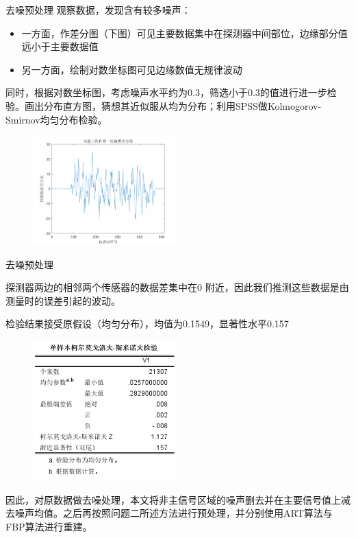 \documentclass{beamer}
\begin{document}
\begin{frame}{去噪预处理}
	\small 观察数据，发现含有较多噪声：
	  
	\begin{itemize}
		  
		\item \small 一方面，作差分图（下图）可见主要数据集中在探测器中间部位，边缘部分值远小于主要数据值
		        
		\item \small 另一方面，绘制对数坐标图可见边缘数值无规律波动
		        
	\end{itemize}
	  
	同时，根据对数坐标图，考虑噪声水平约为0.3，筛选小于0.3的值进行进一步检验。画出分布直方图，猜想其近似服从均为分布；利用SPSS做Kolmogorov-Smirnov均匀分布检验。
	
	\begin{figure}[H]
		\centering
		\includegraphics[width=0.5\textwidth]{./pic/fujian5_1.png}\\
	\end{figure}
\end{frame}
  
  
  
\begin{frame}{去噪预处理}
	  

	\small 探测器两边的相邻两个传感器的数据差集中在0 附近，因此我们推测这些数据是由测量时的误差引起的波动。
	  
	\small 检验结果接受原假设（均匀分布），均值为0.1549，显著性水平0.157\\
	\begin{figure}[H]
		\centering
		\includegraphics[width=0.5\textwidth]{./pic/K-S.jpg}\\
	\end{figure}
	\small 因此，对原数据做去噪处理，本文将非主信号区域的噪声删去并在主要信号值上减去噪声均值。之后再按照问题二所述方法进行预处理，并分别使用ART算法与FBP算法进行重建。
	  
\end{frame}
  
\end{document}
